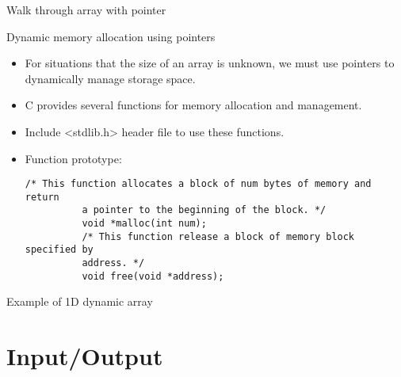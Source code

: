 \documentclass[10pt,t]{beamer}
\begin{document}
\begin{frame}[fragile]{Walk through array with pointer}
  
\end{frame}

\begin{frame}[fragile]{Dynamic memory allocation using pointers}
  \begin{itemize}
  \item For situations that the size of an array is unknown, we must use
    pointers to dynamically manage storage space.
    \item C provides several functions for memory allocation and
    management.
    \item Include <stdlib.h> header file to use these functions.
    \item Function prototype:
      \begin{lstlisting}[basicstyle=\scriptsize\ttfamily]
          /* This function allocates a block of num bytes of memory and return
          a pointer to the beginning of the block. */
          void *malloc(int num);
          /* This function release a block of memory block specified by
          address. */
          void free(void *address);
      \end{lstlisting}
  \end{itemize}
\end{frame}

\begin{frame}[fragile]{Example of 1D dynamic array}
  
\end{frame}

\section{Input/Output}
\end{document}
